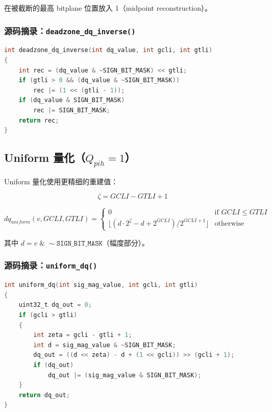 在被截断的最高 bitplane 位置放入 1（midpoint reconstruction）。

\subsubsection{源码摘录：\texttt{deadzone\_dq\_inverse()}}

\begin{lstlisting}[language=C,numbers=none]
int deadzone_dq_inverse(int dq_value, int gcli, int gtli)
{
    int rec = (dq_value & ~SIGN_BIT_MASK) << gtli;
    if (gtli > 0 && (dq_value & ~SIGN_BIT_MASK))
        rec |= (1 << (gtli - 1));
    if (dq_value & SIGN_BIT_MASK)
        rec |= SIGN_BIT_MASK;
    return rec;
}
\end{lstlisting}

\subsection{Uniform 量化（$Q_{pih} = 1$）}

Uniform 量化使用更精细的重建值：

\begin{equation}
\zeta = \mathit{GCLI} - \mathit{GTLI} + 1
\end{equation}

\begin{equation}
\mathit{dq}_{\mathit{uniform}}(v, \mathit{GCLI}, \mathit{GTLI}) =
\begin{cases}
0 & \text{if } \mathit{GCLI} \leq \mathit{GTLI} \\
\lfloor (d \cdot 2^\zeta - d + 2^{\mathit{GCLI}}) / 2^{\mathit{GCLI}+1} \rfloor & \text{otherwise}
\end{cases}
\end{equation}

其中 $d = v \;\&\; \sim\texttt{SIGN\_BIT\_MASK}$（幅度部分）。

\subsubsection{源码摘录：\texttt{uniform\_dq()}}

\begin{lstlisting}[language=C,numbers=none]
int uniform_dq(int sig_mag_value, int gcli, int gtli)
{
    uint32_t dq_out = 0;
    if (gcli > gtli)
    {
        int zeta = gcli - gtli + 1;
        int d = sig_mag_value & ~SIGN_BIT_MASK;
        dq_out = ((d << zeta) - d + (1 << gcli)) >> (gcli + 1);
        if (dq_out)
            dq_out |= (sig_mag_value & SIGN_BIT_MASK);
    }
    return dq_out;
}
\end{lstlisting}

